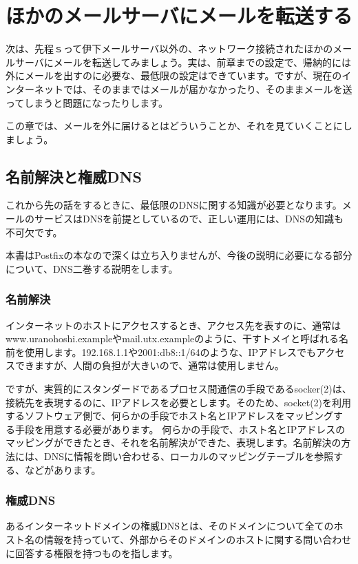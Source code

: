 \chapter{ほかのメールサーバにメールを転送する}

次は、先程ｓって伊下メールサーバ以外の、ネットワーク接続されたほかのメールサーバにメールを転送してみましょう。実は、前章までの設定で、帰納的には外にメールを出すのに必要な、最低限の設定はできています。ですが、現在のインターネットでは、そのままではメールが届かなかったり、そのままメールを送ってしまうと問題になったりします。

この章では、メールを外に届けるとはどういうことか、それを見ていくことにしましょう。

\section{名前解決と権威DNS}

これから先の話をするときに、最低限のDNSに関する知識が必要となります。メールのサービスはDNSを前提としているので、正しい運用には、DNSの知識も不可欠です。

本書はPostfixの本なので深くは立ち入りませんが、今後の説明に必要になる部分について、DNS二巻する説明をします。

\subsection{名前解決}
インターネットのホストにアクセスするとき、アクセス先を表すのに、通常はwww.uranohoshi.exampleやmail.utx.exampleのように、干すトメイと呼ばれる名前を使用します。192.168.1.1や2001:db8::1/64のような、IPアドレスでもアクセスできますが、人間の負担が大きいので、通常は使用しません。

ですが、実質的にスタンダードであるプロセス間通信の手段であるsocker(2)は、接続先を表現するのに、IPアドレスを必要とします。そのため、socket(2)を利用するソフトウェア側で、何らかの手段でホスト名とIPアドレスをマッピングする手段を用意する必要があります。
何らかの手段で、ホスト名とIPアドレスのマッピングができたとき、それを名前解決ができた、表現します。名前解決の方法には、DNSに情報を問い合わせる、ローカルのマッピングテーブルを参照する、などがあります。

\subsection{権威DNS}
あるインターネットドメインの権威DNSとは、そのドメインについて全てのホスト名の情報を持っていて、外部からそのドメインのホストに関する問い合わせに回答する権限を持つものを指します。

